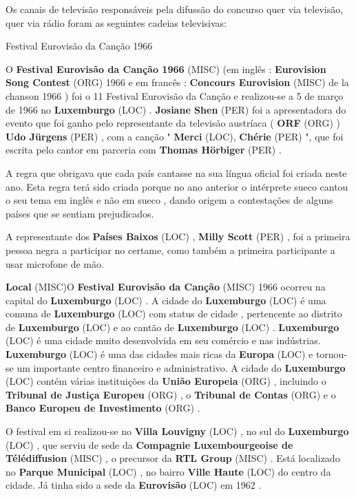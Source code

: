 \documentclass[12pt,a4paper]{article}
\begin{document}
Os canais de televisão responsáveis pela difussão do concurso quer via televisão, quer via rádio foram as seguintes cadeias televisivas:



Festival Eurovisão da Canção 1966



O \textbf{Festival Eurovisão da Canção 1966} (MISC) (em inglês : \textbf{Eurovision Song Contest} (ORG) 1966 e em francês : \textbf{Concours Eurovision} (MISC) de la chanson 1966 ) foi o 11 Festival Eurovisão da Canção e realizou-se a 5 de março de 1966 no \textbf{Luxemburgo} (LOC) . \textbf{Josiane Shen} (PER) foi a apresentadora do evento que foi ganho pelo representante da televisão austríaca ( \textbf{ORF} (ORG) ) \textbf{Udo Jürgens} (PER) , com a canção " \textbf{Merci} (LOC), \textbf{Chérie} (PER) ", que foi escrita pelo cantor em parceria com \textbf{Thomas Hörbiger} (PER) .

A regra que obrigava que cada país cantasse na sua língua oficial foi criada neste ano. Esta regra terá sido criada porque no ano anterior o intérprete sueco cantou o seu tema em inglês e não em sueco , dando origem a contestações de alguns países que se sentiam prejudicados.

A representante dos \textbf{Países Baixos} (LOC) , \textbf{Milly Scott} (PER) , foi a primeira pessoa negra a participar no certame, como também a primeira participante a usar microfone de mão.



\textbf{Local} (MISC)O \textbf{Festival Eurovisão da Canção} (MISC) 1966 ocorreu na capital do \textbf{Luxemburgo} (LOC) . A cidade do \textbf{Luxemburgo} (LOC) é uma comuna de \textbf{Luxemburgo} (LOC) com status de cidade , pertencente ao distrito de \textbf{Luxemburgo} (LOC) e ao cantão de \textbf{Luxemburgo} (LOC) . \textbf{Luxemburgo} (LOC) é uma cidade muito desenvolvida em seu comércio e nas indústrias. \textbf{Luxemburgo} (LOC) é uma das cidades mais ricas da \textbf{Europa} (LOC) e tornou-se um importante centro financeiro e administrativo. A cidade do \textbf{Luxemburgo} (LOC) contém várias instituições da \textbf{União Europeia} (ORG) , incluindo o \textbf{Tribunal de Justiça Europeu} (ORG) , o \textbf{Tribunal de Contas} (ORG) e o \textbf{Banco Europeu de Investimento} (ORG) .

O festival em si realizou-se no \textbf{Villa Louvigny} (LOC) , no sul do \textbf{Luxemburgo} (LOC) , que serviu de sede da \textbf{Compagnie Luxembourgeoise de Télédiffusion} (MISC) , o precursor da \textbf{RTL Group} (MISC) . Está localizado no \textbf{Parque Municipal} (LOC) , no bairro \textbf{Ville Haute} (LOC) do centro da cidade. Já tinha sido a sede da \textbf{Eurovisão} (LOC) em 1962 .
\end{document}
